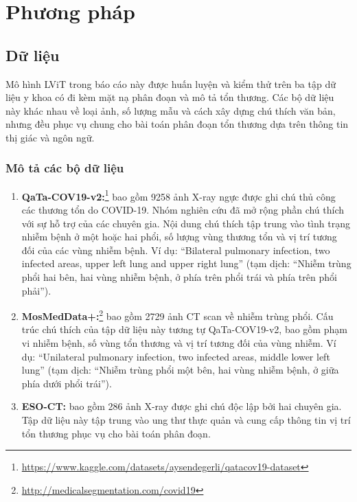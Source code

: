 \chapter{Phương pháp}
\label{Chapter3}
\setcounter{secnumdepth}{5}

\section{Dữ liệu}

Mô hình LViT trong báo cáo này được huấn luyện và kiểm thử trên ba tập dữ liệu y khoa có đi kèm mặt nạ phân đoạn và mô tả tổn thương. Các bộ dữ liệu này khác nhau về loại ảnh, số lượng mẫu và cách xây dựng chú thích văn bản, nhưng đều phục vụ chung cho bài toán phân đoạn tổn thương dựa trên thông tin thị giác và ngôn ngữ.

\subsection{Mô tả các bộ dữ liệu}

\begin{enumerate}
    \item \textbf{QaTa-COV19-v2:}\footnote{\href{https://www.kaggle.com/datasets/aysendegerli/qatacov19-dataset}{https://www.kaggle.com/datasets/aysendegerli/qatacov19-dataset}} bao gồm 9258 ảnh X-ray ngực được ghi chú thủ công các thương tổn do COVID-19. Nhóm nghiên cứu đã mở rộng phần chú thích với sự hỗ trợ của các chuyên gia. Nội dung chú thích tập trung vào tình trạng nhiễm bệnh ở một hoặc hai phổi, số lượng vùng thương tổn và vị trí tương đối của các vùng nhiễm bệnh. Ví dụ: ``Bilateral pulmonary infection, two infected areas, upper left lung and upper right lung'' (tạm dịch: ``Nhiễm trùng phổi hai bên, hai vùng nhiễm bệnh, ở phía trên phổi trái và phía trên phổi phải'').

    \item \textbf{MosMedData+:}\footnote{\href{http://medicalsegmentation.com/covid19}{http://medicalsegmentation.com/covid19}} bao gồm 2729 ảnh CT scan về nhiễm trùng phổi. Cấu trúc chú thích của tập dữ liệu này tương tự QaTa-COV19-v2, bao gồm phạm vi nhiễm bệnh, số vùng tổn thương và vị trí tương đối của vùng nhiễm. Ví dụ: ``Unilateral pulmonary infection, two infected areas, middle lower left lung'' (tạm dịch: ``Nhiễm trùng phổi một bên, hai vùng nhiễm bệnh, ở giữa phía dưới phổi trái'').

    \item \textbf{ESO-CT:} bao gồm 286 ảnh X-ray được ghi chú độc lập bởi hai chuyên gia. Tập dữ liệu này tập trung vào ung thư thực quản và cung cấp thông tin vị trí tổn thương phục vụ cho bài toán phân đoạn.
\end{enumerate}

